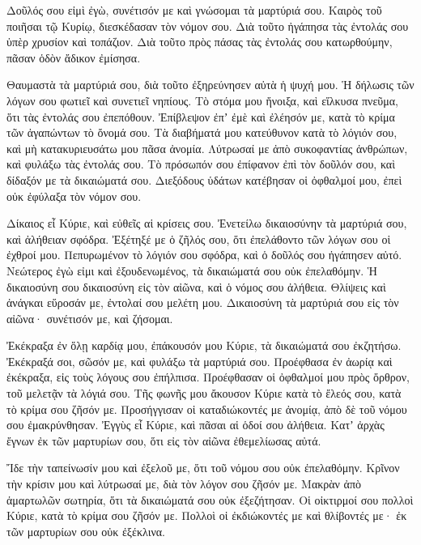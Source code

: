 {Δοῦλός σου εἰμὶ ἐγὼ, συνέτισόν με καὶ γνώσομαι τὰ μαρτύριά σου.
Καιρὸς τοῦ ποιῆσαι τῷ Κυρίῳ, διεσκέδασαν τὸν νόμον σου.
Διὰ τοῦτο ἠγάπησα τὰς ἐντολάς σου ὑπὲρ χρυσίον καὶ τοπάζιον.
Διὰ τοῦτο πρὸς πάσας τὰς ἐντολάς σου κατωρθούμην, πᾶσαν ὁδὸν ἄδικον ἐμίσησα.
\par }{\PP {}Θαυμαστὰ τὰ μαρτύριά σου, διὰ τοῦτο ἐξηρεύνησεν αὐτὰ ἡ ψυχή μου.
Ἡ δήλωσις τῶν λόγων σου φωτιεῖ καὶ συνετιεῖ νηπίους.
Τὸ στόμα μου ἤνοιξα, καὶ εἵλκυσα πνεῦμα, ὅτι τὰς ἐντολάς σου ἐπεπόθουν.
Ἐπίβλεψον ἐπʼ ἐμὲ καὶ ἐλέησόν με, κατὰ τὸ κρίμα τῶν ἀγαπώντων τὸ ὄνομά σου.
Τὰ διαβήματά μου κατεύθυνον κατὰ τὸ λόγιόν σου, καὶ μὴ κατακυριευσάτω μου πᾶσα ἀνομία.
Λύτρωσαί με ἀπὸ συκοφαντίας ἀνθρώπων, καὶ φυλάξω τὰς ἐντολάς σου.
Τὸ πρόσωπόν σου ἐπίφανον ἐπὶ τὸν δοῦλόν σου, καὶ δίδαξόν με τὰ δικαιώματά σου.
Διεξόδους ὑδάτων κατέβησαν οἱ ὀφθαλμοί μου, ἐπεὶ οὐκ ἐφύλαξα τὸν νόμον σου.
\par }{\PP {}Δίκαιος εἶ Κύριε, καὶ εὐθεῖς αἱ κρίσεις σου.
Ἐνετείλω δικαιοσύνην τὰ μαρτύριά σου, καὶ ἀλήθειαν σφόδρα.
Ἐξέτηξέ με ὁ ζῆλός σου, ὅτι ἐπελάθοντο τῶν λόγων σου οἱ ἐχθροί μου.
Πεπυρωμένον τὸ λόγιόν σου σφόδρα, καὶ ὁ δοῦλός σου ἠγάπησεν αὐτό.
Νεώτερος ἐγὼ εἰμι καὶ ἐξουδενωμένος, τὰ δικαιώματά σου οὐκ ἐπελαθόμην.
Ἡ δικαιοσύνη σου δικαιοσύνη εἰς τὸν αἰῶνα, καὶ ὁ νόμος σου ἀλήθεια.
Θλίψεις καὶ ἀνάγκαι εὕροσάν με, ἐντολαί σου μελέτη μου.
Δικαιοσύνη τὰ μαρτύριά σου εἰς τὸν αἰῶνα· συνέτισόν με, καὶ ζήσομαι.
\par }{\PP {}Ἐκέκραξα ἐν ὅλῃ καρδίᾳ μου, ἐπάκουσόν μου Κύριε, τὰ δικαιώματά σου ἐκζητήσω.
Ἐκέκραξά σοι, σῶσόν με, καὶ φυλάξω τὰ μαρτύριά σου.
Προέφθασα ἐν ἀωρίᾳ καὶ ἐκέκραξα, εἰς τοὺς λόγους σου ἐπήλπισα.
Προέφθασαν οἱ ὀφθαλμοί μου πρὸς ὄρθρον, τοῦ μελετᾷν τὰ λόγιά σου.
Τῆς φωνῆς μου ἄκουσον Κύριε κατὰ τὸ ἔλεός σου, κατὰ τὸ κρίμα σου ζῆσόν με.
Προσήγγισαν οἱ καταδιώκοντές με ἀνομίᾳ, ἀπὸ δὲ τοῦ νόμου σου ἐμακρύνθησαν.
Ἐγγὺς εἶ Κύριε, καὶ πᾶσαι αἱ ὁδοί σου ἀλήθεια.
Κατʼ ἀρχὰς ἔγνων ἐκ τῶν μαρτυρίων σου, ὅτι εἰς τὸν αἰῶνα ἐθεμελίωσας αὐτά.
\par }{\PP {}Ἴδε τὴν ταπείνωσίν μου καὶ ἐξελοῦ με, ὅτι τοῦ νόμου σου οὐκ ἐπελαθόμην.
Κρῖνον τὴν κρίσιν μου καὶ λύτρωσαί με, διὰ τὸν λόγον σου ζῆσόν με.
Μακρὰν ἀπὸ ἁμαρτωλῶν σωτηρία, ὅτι τὰ δικαιώματά σου οὐκ ἐξεζήτησαν.
Οἱ οἰκτιρμοί σου πολλοὶ Κύριε, κατὰ τὸ κρίμα σου ζῆσόν με.
Πολλοὶ οἱ ἐκδιώκοντές με καὶ θλίβοντές με· ἐκ τῶν μαρτυρίων σου οὐκ ἐξέκλινα.
}
